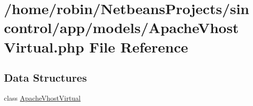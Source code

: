 \hypertarget{app_2models_2_apache_vhost_virtual_8php}{}\section{/home/robin/\+Netbeans\+Projects/sincontrol/app/models/\+Apache\+Vhost\+Virtual.php File Reference}
\label{app_2models_2_apache_vhost_virtual_8php}
\subsection*{Data Structures}
\begin{DoxyCompactItemize}
\item 
class \hyperlink{class_apache_vhost_virtual}{Apache\+Vhost\+Virtual}
\end{DoxyCompactItemize}
